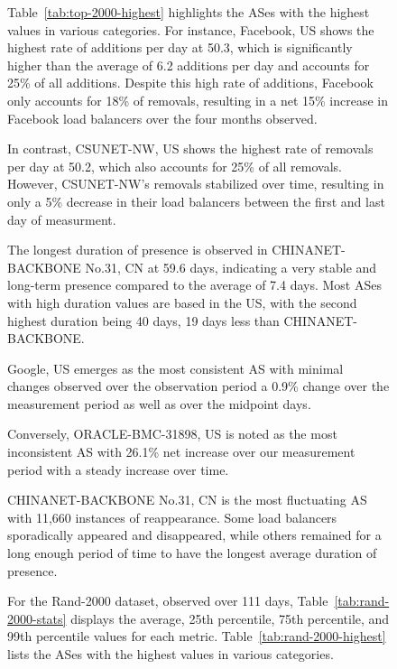 \documentclass[12pt]{cwru_thesis}
\begin{document}
\begin{figure}[h!]
Table~\ref{tab:top-2000-highest} highlights the ASes with the highest values in various categories. For instance, Facebook, US shows the highest rate of additions per day at 50.3, which is significantly higher than the average of 6.2 additions per day and accounts for 25\% of all additions. Despite this high rate of additions, Facebook only accounts for 18\% of removals, resulting in a net 15\% increase in Facebook load balancers over the four months observed.

In contrast, CSUNET-NW, US shows the highest rate of removals per day at 50.2, which also accounts for 25\% of all removals. However, CSUNET-NW's removals stabilized over time, resulting in only a 5\% decrease in their load balancers between the first and last day of measurment.

The longest duration of presence is observed in CHINANET-BACKBONE No.31, CN at 59.6 days, indicating a very stable and long-term presence compared to the average of 7.4 days. Most ASes with high duration values are based in the US, with the second highest duration being 40 days, 19 days less than CHINANET-BACKBONE. 

Google, US emerges as the most consistent AS with minimal changes observed over the observation period a 0.9\% change over the measurement period as well as over the midpoint days. 

Conversely, ORACLE-BMC-31898, US is noted as the most inconsistent AS with 26.1\% net increase over our measurement period with a steady increase over time.

CHINANET-BACKBONE No.31, CN is the most fluctuating AS with 11,660 instances of reappearance. Some load balancers sporadically appeared and disappeared, while others remained for a long enough period of time to have the longest average duration of presence.




For the Rand-2000 dataset, observed over 111 days, Table~\ref{tab:rand-2000-stats} displays the average, 25th percentile, 75th percentile, and 99th percentile values for each metric. Table~\ref{tab:rand-2000-highest} lists the ASes with the highest values in various categories.


\end{figure}
\end{document}
